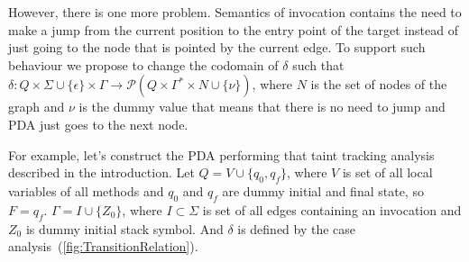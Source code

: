 However, there is one more problem.
Semantics of invocation contains the need to make a jump from the current position to the entry point of the target instead of just going to the node that is pointed by the current edge.
To support such behaviour we propose to change the codomain of $\delta$ such that $\delta: Q \times \Sigma \cup \{\epsilon\} \times \Gamma \rightarrow \mathcal P (Q \times \Gamma^* \times N \cup \{\nu\})$, where $N$ is the set of nodes of the graph and $\nu$ is the dummy value that means that there is no need to jump and PDA just goes to the next node.

For example, let's construct the PDA performing that taint tracking analysis described in the introduction.
Let $Q = V \cup \{q_0, q_f\}$, where $V$ is set of all local variables of all methods and $q_0$ and $q_f$ are dummy initial and final state, so $F = {q_f}$.
$\Gamma = I \cup \{Z_0\}$, where $I \subset \Sigma$ is set of all edges containing an invocation and $Z_0$ is dummy initial stack symbol.
And $\delta$ is defined by the case analysis~(\ref{fig:TransitionRelation}).
